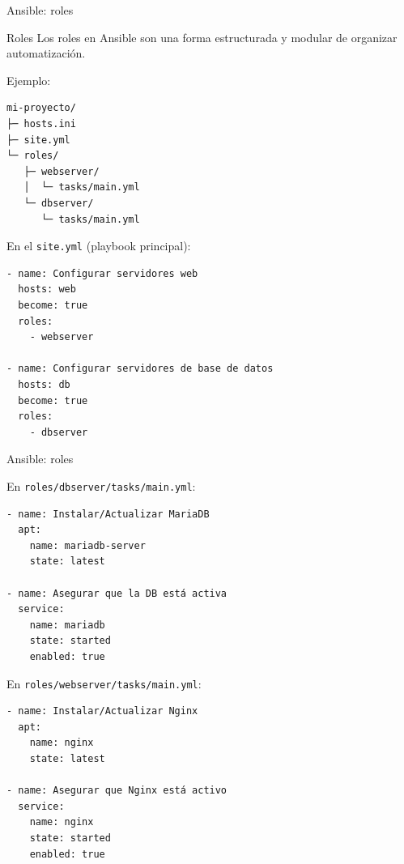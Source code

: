 \documentclass{beamer}
\begin{document}
\begin{frame}[fragile]{Ansible: roles}

\begin{block}{Roles}
Los roles en Ansible son una forma estructurada y modular de organizar automatización.
\end{block}

Ejemplo:

\begin{verbatim}
mi-proyecto/
├─ hosts.ini
├─ site.yml
└─ roles/
   ├─ webserver/
   │  └─ tasks/main.yml
   └─ dbserver/
      └─ tasks/main.yml
\end{verbatim}

En el \texttt{site.yml} (playbook principal):

\begin{verbatim}
- name: Configurar servidores web
  hosts: web
  become: true
  roles:
    - webserver

- name: Configurar servidores de base de datos
  hosts: db
  become: true
  roles:
    - dbserver
\end{verbatim}
\end{frame}

\begin{frame}[fragile]{Ansible: roles}

En \texttt{roles/dbserver/tasks/main.yml}:
\begin{verbatim}
- name: Instalar/Actualizar MariaDB
  apt:
    name: mariadb-server
    state: latest

- name: Asegurar que la DB está activa
  service:
    name: mariadb
    state: started
    enabled: true
\end{verbatim}

En \texttt{roles/webserver/tasks/main.yml}:
\begin{verbatim}
- name: Instalar/Actualizar Nginx
  apt:
    name: nginx
    state: latest

- name: Asegurar que Nginx está activo
  service:
    name: nginx
    state: started
    enabled: true
\end{verbatim}

    
\end{frame}
\end{document}
